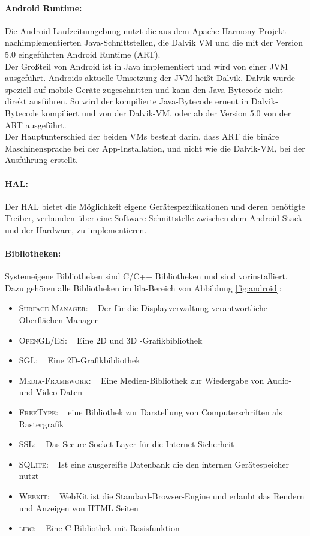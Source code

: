 \paragraph{Android Runtime: }
Die Android Laufzeitumgebung nutzt die aus dem Apache-Harmony-Projekt nachimplementierten Java-Schnittstellen, die Dalvik \gls{VM} und die mit der Version 5.0 eingeführten Android Runtime (ART). \cite{android_5}\\
Der Großteil von Android ist in Java implementiert und wird von einer \gls{JVM} ausgeführt. Androids aktuelle Umsetzung der \gls{JVM} heißt Dalvik. Dalvik wurde speziell auf mobile Geräte zugeschnitten und kann den Java-Bytecode nicht direkt ausführen. So wird der kompilierte Java-Bytecode erneut in Dalvik-Bytecode kompiliert und von der Dalvik-\gls{VM}, oder ab der Version 5.0 von der ART ausgeführt.\\
Der Hauptunterschied der beiden \glspl{VM} besteht darin, dass ART die binäre Maschinensprache bei der \gls{App}-Installation, und nicht wie die Dalvik-\gls{VM}, bei der Ausführung erstellt.
\paragraph{\gls{HAL}: }
Der \gls{HAL} bietet die Möglichkeit eigene Gerätespezifikationen und deren benötigte Treiber, verbunden über eine Software-Schnittstelle zwischen dem Android-Stack und der Hardware, zu implementieren. \cite{android_hal}
\paragraph{Bibliotheken: }
Systemeigene Bibliotheken sind C/C++ Bibliotheken und sind vorinstalliert. Dazu gehören alle Bibliotheken im lila-Bereich von Abbildung \ref{fig:android}:
\begin{itemize}[leftmargin=0.7cm]
\renewcommand\labelitemi{--}
	\item \textsc{Surface Manager}: ~ Der für die Displayverwaltung verantwortliche Oberflächen-Manager
	\item \textsc{OpenGL/ES}: ~ Eine 2D und 3D -Grafikbibliothek
	\item \textsc{SGL}: ~ Eine 2D-Grafikbibliothek
 	\item \textsc{Media-Framework}: ~ Eine Medien-Bibliothek zur Wiedergabe von Audio- und Video-Daten 	
 	\item \textsc{FreeType}: ~ eine Bibliothek zur Darstellung von Computerschriften als Rastergrafik
 	\item \textsc{SSL}: ~ Das Secure-Socket-Layer für die Internet-Sicherheit
	\item \textsc{SQLite}: ~ Ist eine ausgereifte Datenbank die den internen Gerätespeicher nutzt 
	\item \textsc{Webkit}: ~ WebKit ist die Standard-Browser-Engine und erlaubt das Rendern und Anzeigen von HTML Seiten
	\item \textsc{libc}: ~ Eine C-Bibliothek mit Basisfunktion
\end{itemize}

